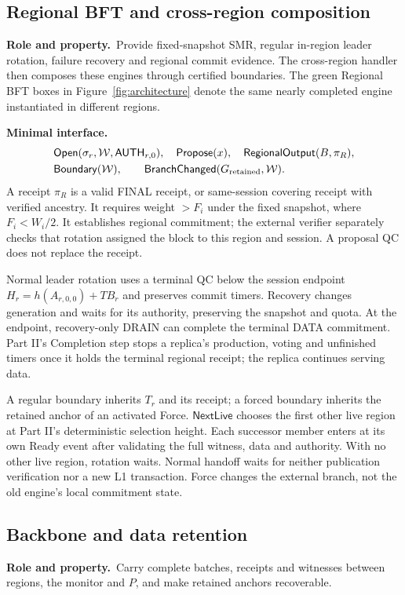 \documentclass[11pt,a4paper]{article}
\newcommand{\api}[1]{\ensuremath{\mathsf{#1}}}
\newcommand{\TB}{\mathit{TB}}
\newcommand{\role}{\textbf{Role and property.}\ }
\newcommand{\iface}{\textbf{Minimal interface.}\ }
\begin{document}
\subsection{Regional BFT and cross-region composition}
\role Provide fixed-snapshot SMR, regular in-region leader rotation,
failure recovery and regional commit evidence. The cross-region handler
then composes these engines through certified boundaries. The green
Regional BFT boxes in Figure~\ref{fig:architecture} denote the same
nearly completed engine instantiated in different regions.

\iface
\[
\begin{aligned}
 &\api{Open}(\sigma_r,\mathcal W,\api{AUTH}_{r,0}),\quad
   \api{Propose}(x),\quad \api{RegionalOutput}(B,\pi_R),\\
 &\api{Boundary}(\mathcal W),\qquad
   \api{BranchChanged}(G_{\rm retained},\mathcal W).
\end{aligned}
\]
A receipt $\pi_R$ is a valid FINAL receipt, or same-session covering
receipt with verified ancestry. It requires weight $>F_i$ under the
fixed snapshot, where $F_i<W_i/2$. It establishes regional commitment;
the external verifier separately checks that rotation assigned the block
to this region and session. A proposal QC does not replace the receipt.

Normal leader rotation uses a terminal QC below the session endpoint
$H_r=h(A_{r,0,0})+\TB_r$ and preserves commit timers. Recovery changes
generation and waits for its authority, preserving the snapshot and quota.
At the endpoint, recovery-only DRAIN can complete the terminal DATA
commitment. Part II's Completion step stops a replica's production,
voting and unfinished timers once it holds the terminal regional receipt;
the replica continues serving data.

A regular boundary inherits $T_r$ and its receipt; a forced boundary
inherits the retained anchor of an activated Force. \api{NextLive}
chooses the first other live region at Part II's deterministic selection
height. Each successor member enters at its own Ready event after
validating the full witness, data and authority. With no other live
region, rotation waits. Normal handoff waits for neither publication
verification nor a new L1 transaction. Force changes the external branch,
not the old engine's local commitment state.

\subsection{Backbone and data retention}
\role Carry complete batches, receipts and witnesses between regions,
the monitor and $P$, and make retained anchors recoverable.
\end{document}
